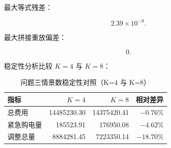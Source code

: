 最大等式残差：

\[
2.39\times10^{-9}.
\]

最大拼接重放偏差：

\[
0.
\]

稳定性分析比较 \(K=4\) 与 \(K=8\)：

\begin{table}[H]
\centering
{}
\begin{tabular}{lrrr}
\toprule
指标 & \(K=4\) & \(K=8\) & 相对差异 \\
\midrule
总费用 & 14485230.30 & 14375420.41 & $-0.76\%$ \\
紧急购电量 & 185523.91 & 176950.08 & $-4.62\%$ \\
调整总量 & 8884281.45 & 7223350.14 & $-18.70\%$ \\
\bottomrule
\end{tabular}
\caption{问题三情景数稳定性对照（K=4 与 K=8）}
\label{tab:10}
\end{table}
